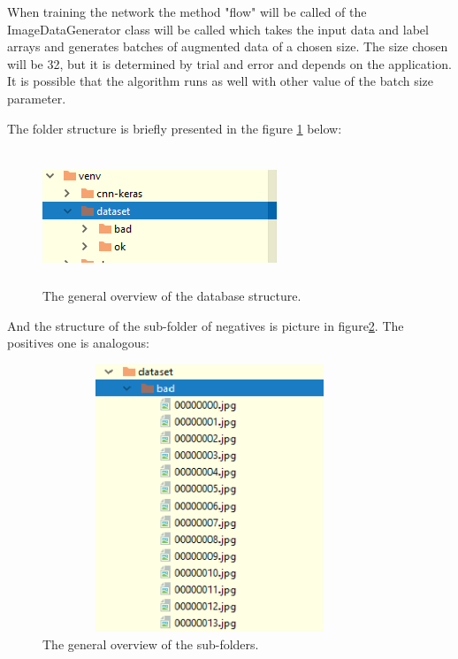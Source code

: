 \documentclass[12pt,a4paper,twoside]{report}
\begin{document}
When training the network the method "flow" will be called of the ImageDataGenerator class will be called which takes the input data and label arrays and generates batches of augmented data of a chosen size. The size chosen will be 32, but it is determined by trial and error and depends on the application. It is possible that the algorithm runs as well with other value of the batch size parameter.\par
The folder structure is briefly presented in the figure \ref{fig:imagesystem1} below:

\begin{figure}[h]
	\centering
	\includegraphics[width=7cm, height=4cm]{img/data/databasestructure.png}
	\caption[]
	{The general overview of the database structure.}
	\label{fig:imagesystem1}
\end{figure}\par

And the structure of the sub-folder of negatives is picture in figure\ref{fig:folders}. The positives one is analogous:\par

\begin{figure}[h]
	\centering
	\includegraphics[width=10cm, height=8cm]{img/data/databasestructure1.png}
	\caption[]
	{The general overview of the sub-folders.}
	\label{fig:folders}
\end{figure}\par
\end{document}
